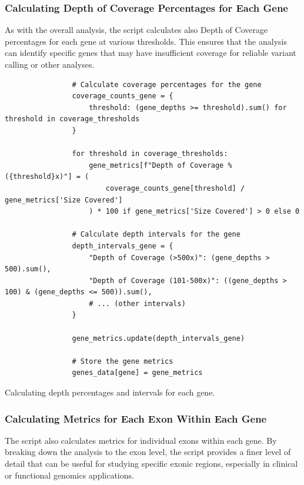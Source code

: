 \subsubsection{\textbf{Calculating Depth of Coverage Percentages for Each Gene}}

As with the overall analysis, the script calculates also Depth of Coverage percentages for each gene at various thresholds. This ensures that the analysis can identify specific genes that may have insufficient coverage for reliable variant calling or other analyses.

\begin{longlisting}
\begin{verbatim}
                # Calculate coverage percentages for the gene
                coverage_counts_gene = {
                    threshold: (gene_depths >= threshold).sum() for threshold in coverage_thresholds
                }

                for threshold in coverage_thresholds:
                    gene_metrics[f"Depth of Coverage % ({threshold}x)"] = (
                        coverage_counts_gene[threshold] / gene_metrics['Size Covered']
                    ) * 100 if gene_metrics['Size Covered'] > 0 else 0

                # Calculate depth intervals for the gene
                depth_intervals_gene = {
                    "Depth of Coverage (>500x)": (gene_depths > 500).sum(),
                    "Depth of Coverage (101-500x)": ((gene_depths > 100) & (gene_depths <= 500)).sum(),
                    # ... (other intervals)
                }

                gene_metrics.update(depth_intervals_gene)

                # Store the gene metrics
                genes_data[gene] = gene_metrics
\end{verbatim}
\caption{Calculating depth percentages and intervals for each gene.}
\label{lbl:metrics_gene_coverage}
\end{longlisting}


\subsubsection{\textbf{Calculating Metrics for Each Exon Within Each Gene}}

The script also calculates metrics for individual exons within each gene. By breaking down the analysis to the exon level, the script provides a finer level of detail that can be useful for studying specific exonic regions, especially in clinical or functional genomics applications.

